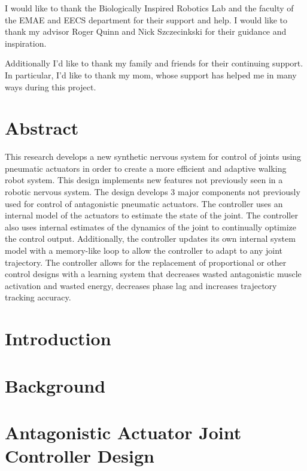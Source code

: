 \documentclass[12pt, letterpaper, oneside, onecolumn]{report} %
\begin{document}
I would like to thank the Biologically Inspired Robotics Lab and the faculty of
the EMAE and EECS department for their support and help. I would like to thank my advisor Roger Quinn and Nick Szczecinkski for their guidance and inspiration.

Additionally I'd like to thank my family and friends for their continuing support. In particular, I'd like to thank my mom, whose support has helped me in many ways during this project.

\chapter*{Abstract}
\label{chap:abstract}

This research develops a new synthetic nervous system for control of joints using pneumatic actuators in order to create a more efficient and adaptive walking robot system. This design implements new features not previously seen in a robotic nervous system. The design develops 3 major components not previously used for control of antagonistic pneumatic actuators. The controller uses an internal model of the actuators to estimate the state of the joint. The controller also uses internal estimates of the dynamics of the joint to continually optimize the control output. Additionally, the controller updates its own internal system model with a memory-like loop to allow the controller to adapt to any joint trajectory. The controller allows for the replacement of proportional or other control designs with a learning system that decreases wasted antagonistic muscle activation and wasted energy, decreases phase lag and increases trajectory tracking accuracy.

\chapter{Introduction}
\label{chap:introduction}



\chapter{Background}
\label{chap:lit_review}


\chapter{Antagonistic Actuator Joint Controller Design}
\label{chap:controller_design}

\end{document}
